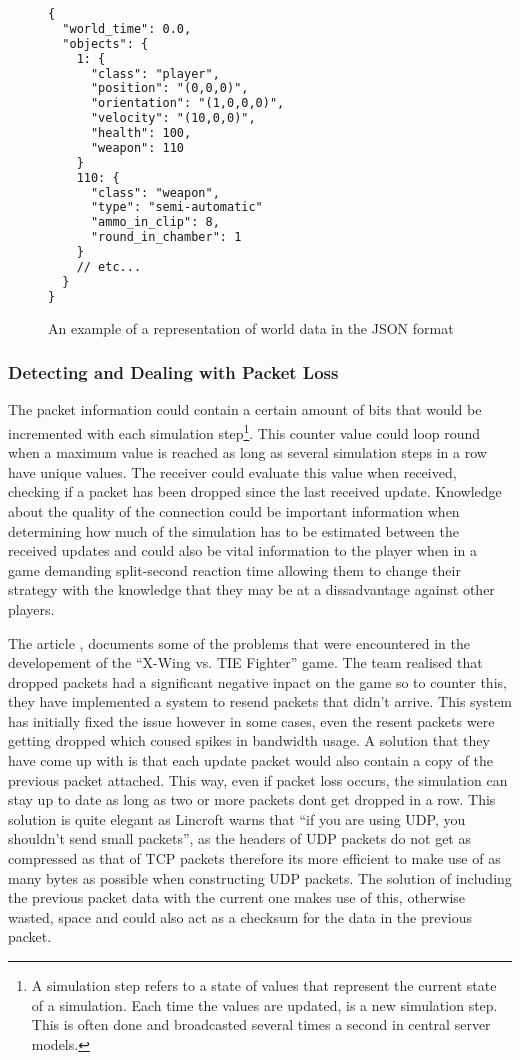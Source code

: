 \begin{figure}[!ht]
\begin{lstlisting}[language=xml]
{
  "world_time": 0.0,
  "objects": {
    1: {
      "class": "player",
      "position": "(0,0,0)",
      "orientation": "(1,0,0,0)",
      "velocity": "(10,0,0)",
      "health": 100,
      "weapon": 110
    }
    110: {
      "class": "weapon",
      "type": "semi-automatic"
      "ammo_in_clip": 8,
      "round_in_chamber": 1
    }
    // etc...
  }
}
\end{lstlisting}

\caption{An example of a representation of world data in the JSON format}
\label{fig:json-example}
\end{figure}

\newpage


\subsubsection{Detecting and Dealing with Packet Loss}
The packet information could contain a certain amount of bits that would be incremented with each simulation step\footnote{A simulation step refers to a state of values that represent the current state of a simulation. Each time the values are updated, is a new simulation step. This is often done and broadcasted several times a second in central server models.}. This counter value could loop round when a maximum value is reached as long as several simulation steps in a row have unique values. The receiver could evaluate this value when received, checking if a packet has been dropped since the last received update. Knowledge about the quality of the connection could be important information when determining how much of the simulation has to be estimated between the received updates and could also be vital information to the player when in a game demanding split-second reaction time allowing them to change their strategy with the knowledge that they may be at a dissadvantage against other players.

The article , documents some of the problems that were encountered in the developement of the ``X-Wing vs. TIE Fighter'' game. The team realised that dropped packets had a significant negative inpact on the game so to counter this, they have implemented a system to resend packets that didn't arrive. This system has initially fixed the issue however in some cases, even the resent packets were getting dropped which coused spikes in bandwidth usage. A solution that they have come up with is that each update packet would also contain a copy of the previous packet attached. This way, even if packet loss occurs, the simulation can stay up to date as long as two or more packets dont get dropped in a row. This solution is quite elegant as Lincroft warns that ``if you are using UDP, you shouldn’t send small packets'', as the headers of UDP packets do not get as compressed as that of TCP packets therefore its more efficient to make use of as many bytes as possible when constructing UDP packets. The solution of including the previous packet data with the current one makes use of this, otherwise wasted, space and could also act as a checksum for the data in the previous packet.

